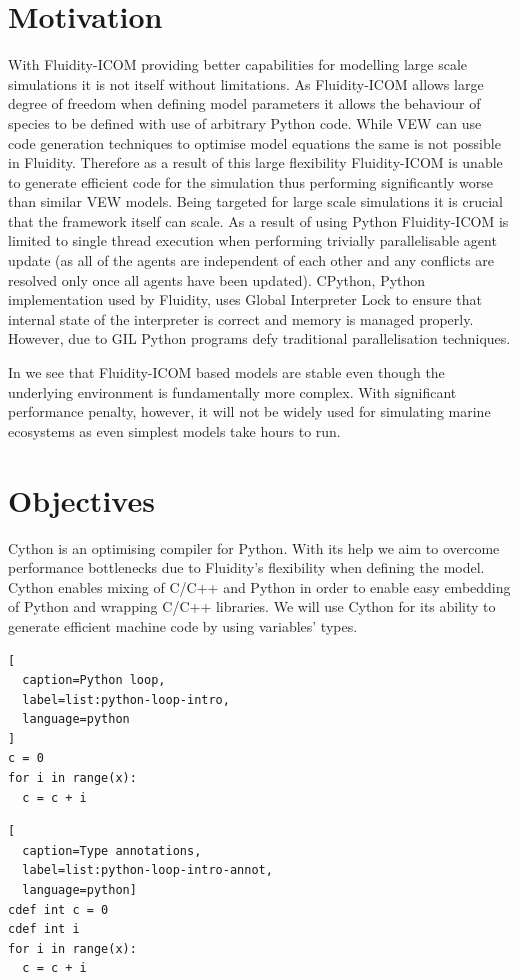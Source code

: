 \documentclass[12pt, a4paper]{report}
\begin{document}
\section{Motivation}\label{sec:intro-motiv}
With Fluidity-ICOM providing better capabilities for modelling large scale
simulations it is not itself without limitations. As Fluidity-ICOM
allows large degree of freedom when defining model parameters it allows
the behaviour of species to be defined with use of arbitrary Python code.
While VEW can use code generation techniques to optimise model equations
the same is not possible in Fluidity. Therefore as a result of this large
flexibility Fluidity-ICOM is unable to generate efficient code for the
simulation thus performing significantly worse than similar VEW models.
Being targeted for large scale simulations it is crucial that the
framework itself can scale. As a result of using Python Fluidity-ICOM
is limited to single thread execution when performing trivially
parallelisable agent update (as all of the agents are independent of each
other and any conflicts are resolved only once all agents have been updated).
CPython, Python implementation used by Fluidity, uses Global Interpreter Lock
to ensure that internal state of the interpreter is correct and memory
is managed properly. However, due to GIL Python programs defy traditional
parallelisation techniques.

In \cite{FluidityVEW} we see that Fluidity-ICOM based models are stable even
though the underlying environment is fundamentally more complex. With significant
performance penalty, however, it will not be widely used for simulating
marine ecosystems as even simplest models take hours to run.

\section{Objectives}\label{sec:intro-obj}
Cython is an optimising compiler for Python. With its help we aim to
overcome performance bottlenecks due to Fluidity's flexibility when
defining the model. Cython enables mixing of C/C++ and Python in order
to enable easy embedding of Python and wrapping C/C++ libraries. We will
use Cython for its ability to generate efficient machine code by using
variables' types.

\noindent\begin{minipage}{.45\textwidth}
\begin{lstlisting}[
  caption=Python loop,
  label=list:python-loop-intro,
  language=python
]
c = 0
for i in range(x):
  c = c + i
\end{lstlisting}
\end{minipage}\hfill
\begin{minipage}{.45\textwidth}
\begin{lstlisting}[
  caption=Type annotations,
  label=list:python-loop-intro-annot,
  language=python]
cdef int c = 0
cdef int i
for i in range(x):
  c = c + i
\end{lstlisting}
\end{minipage}
\end{document}
